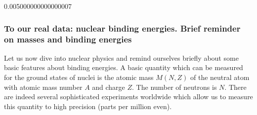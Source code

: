 \documentclass[letterpaper,10pt,english]{sphinxmanual}
\begin{document}
\begin{sphinxVerbatim}[commandchars=\\\{\}]
 
       
     

 
\end{sphinxVerbatim}

\noindent{}

\begin{sphinxVerbatim}[commandchars=\\\{\}]
0.005000000000000007
\end{sphinxVerbatim}


\subsubsection{To our real data: nuclear binding energies. Brief reminder on masses and binding energies}
\label{\detokenize{chapter2:to-our-real-data-nuclear-binding-energies-brief-reminder-on-masses-and-binding-energies}}
Let us now dive into  nuclear physics and remind ourselves briefly about some basic features about binding
energies.  A basic quantity which can be measured for the ground
states of nuclei is the atomic mass \(M(N, Z)\) of the neutral atom with
atomic mass number \(A\) and charge \(Z\). The number of neutrons is \(N\). There are indeed several sophisticated experiments worldwide which allow us to measure this quantity to high precision (parts per million even).
\end{document}
